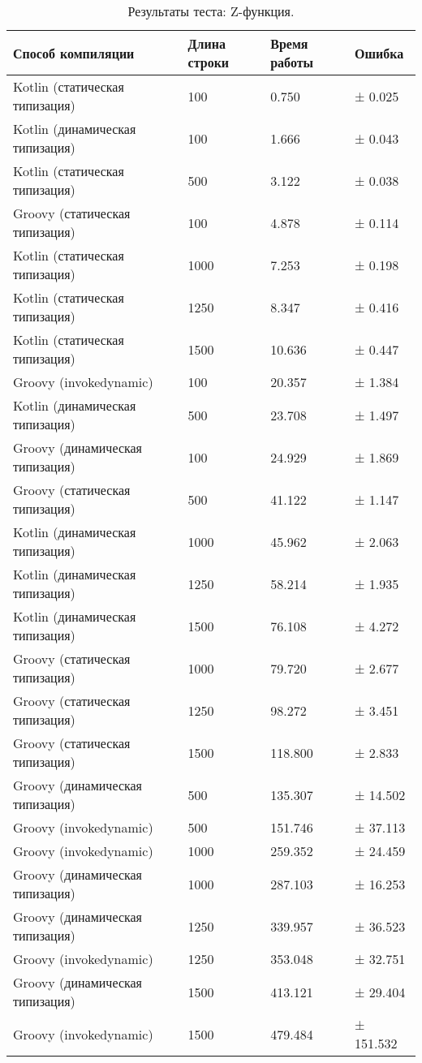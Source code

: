 \begin{table}[h]
\caption{\label{tab:zFunctionBenchResults}Результаты теста: Z-функция.}
\begin{center}
\begin{tabular}{|l|l|l|l|}
\hline
Способ компиляции & Длина строки	& Время работы & Ошибка \\
\hline
Kotlin (статическая типизация)  &  100 &   0.750 & ±   0.025 \\
Kotlin (динамическая типизация) &  100 &   1.666 & ±   0.043 \\
Kotlin (статическая типизация)  &  500 &   3.122 & ±   0.038 \\
Groovy (статическая типизация)  &  100 &   4.878 & ±   0.114 \\
Kotlin (статическая типизация)  & 1000 &   7.253 & ±   0.198 \\
Kotlin (статическая типизация)  & 1250 &   8.347 & ±   0.416 \\
Kotlin (статическая типизация)  & 1500 &  10.636 & ±   0.447 \\
Groovy (invokedynamic)          &  100 &  20.357 & ±   1.384 \\
Kotlin (динамическая типизация) &  500 &  23.708 & ±   1.497 \\
Groovy (динамическая типизация) &  100 &  24.929 & ±   1.869 \\
Groovy (статическая типизация)  &  500 &  41.122 & ±   1.147 \\
Kotlin (динамическая типизация) & 1000 &  45.962 & ±   2.063 \\
Kotlin (динамическая типизация) & 1250 &  58.214 & ±   1.935 \\
Kotlin (динамическая типизация) & 1500 &  76.108 & ±   4.272 \\
Groovy (статическая типизация)  & 1000 &  79.720 & ±   2.677 \\
Groovy (статическая типизация)  & 1250 &  98.272 & ±   3.451 \\
Groovy (статическая типизация)  & 1500 & 118.800 & ±   2.833 \\
Groovy (динамическая типизация) &  500 & 135.307 & ±  14.502 \\
Groovy (invokedynamic)          &  500 & 151.746 & ±  37.113 \\
Groovy (invokedynamic)          & 1000 & 259.352 & ±  24.459 \\
Groovy (динамическая типизация) & 1000 & 287.103 & ±  16.253 \\
Groovy (динамическая типизация) & 1250 & 339.957 & ±  36.523 \\
Groovy (invokedynamic)          & 1250 & 353.048 & ±  32.751 \\
Groovy (динамическая типизация) & 1500 & 413.121 & ±  29.404 \\
Groovy (invokedynamic)          & 1500 & 479.484 & ± 151.532 \\
\hline
\end{tabular}
\end{center}
\end{table} 


